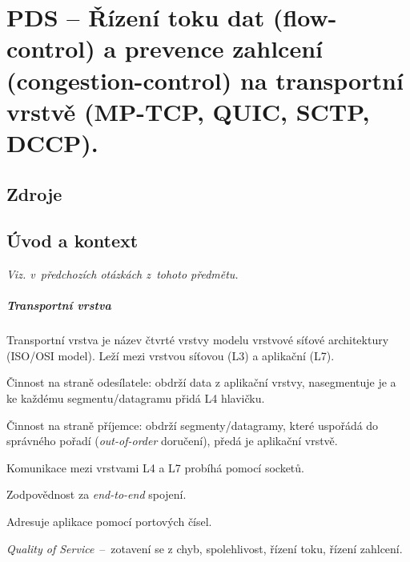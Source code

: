 

\graphicspath{{pds/rizeni_toku_a_prevence_zahlceni/figures}}


\chapter{PDS -- Řízení toku dat (flow-control) a prevence zahlcení (congestion-control) na transportní vrstvě (MP-TCP, QUIC, SCTP, DCCP).}


\section{Zdroje}

\begin{compactitem}
    \item {}
    \item {}
\end{compactitem}


\section{Úvod a kontext}

\textit{Viz.  v~předchozích otázkách z~tohoto předmětu.}

\paragraph*{Transportní vrstva} Transportní vrstva je název čtvrté vrstvy modelu vrstvové síťové architektury (ISO/OSI model). Leží mezi vrstvou síťovou (L3) a aplikační (L7). \begin{compactitem}
    \item Činnost na straně odesílatele: obdrží data z aplikační vrstvy, nasegmentuje je a ke každému segmentu/datagramu přidá L4 hlavičku.
    \item Činnost na straně příjemce: obdrží segmenty/datagramy, které uspořádá do správného pořadí (\textit{out-of-order} doručení), předá je aplikační vrstvě.
    \item Komunikace mezi vrstvami L4 a L7 probíhá pomocí socketů.
    \item Zodpovědnost za \textit{end-to-end} spojení.
    \item Adresuje aplikace pomocí portových čísel.
    \item \textit{Quality of Service}~--~zotavení se z chyb, spolehlivost, řízení toku, řízení zahlcení.
\end{compactitem}

